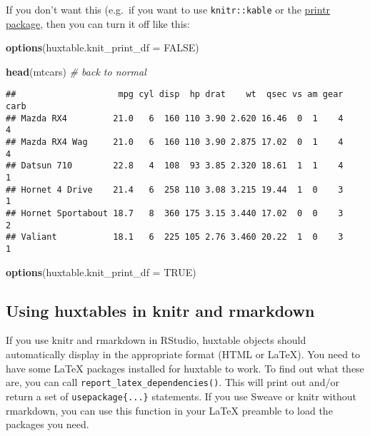 \documentclass[]{article}
\newenvironment{Shaded}{\begin{snugshade}}{\end{snugshade}}
\newcommand{\KeywordTok}[1]{\textcolor[rgb]{0.13,0.29,0.53}{\textbf{#1}}}
\newcommand{\DataTypeTok}[1]{\textcolor[rgb]{0.13,0.29,0.53}{#1}}
\newcommand{\CommentTok}[1]{\textcolor[rgb]{0.56,0.35,0.01}{\textit{#1}}}
\newcommand{\OtherTok}[1]{\textcolor[rgb]{0.56,0.35,0.01}{#1}}
\newcommand{\NormalTok}[1]{#1}
\begin{document}
\FloatBarrier

If you don't want this (e.g.~if you want to use \texttt{knitr::kable} or
the
\href{https://cran.r-project.org/package=printr/vignettes/printr.html}{printr
package}, then you can turn it off like this:

\begin{Shaded}
\begin{Highlighting}[]
\KeywordTok{options}\NormalTok{(}\DataTypeTok{huxtable.knit_print_df =} \OtherTok{FALSE}\NormalTok{)}

\KeywordTok{head}\NormalTok{(mtcars) }\CommentTok{# back to normal}
\end{Highlighting}
\end{Shaded}

\begin{verbatim}
##                    mpg cyl disp  hp drat    wt  qsec vs am gear carb
## Mazda RX4         21.0   6  160 110 3.90 2.620 16.46  0  1    4    4
## Mazda RX4 Wag     21.0   6  160 110 3.90 2.875 17.02  0  1    4    4
## Datsun 710        22.8   4  108  93 3.85 2.320 18.61  1  1    4    1
## Hornet 4 Drive    21.4   6  258 110 3.08 3.215 19.44  1  0    3    1
## Hornet Sportabout 18.7   8  360 175 3.15 3.440 17.02  0  0    3    2
## Valiant           18.1   6  225 105 2.76 3.460 20.22  1  0    3    1
\end{verbatim}

\begin{Shaded}
\begin{Highlighting}[]
\KeywordTok{options}\NormalTok{(}\DataTypeTok{huxtable.knit_print_df =} \OtherTok{TRUE}\NormalTok{)}
\end{Highlighting}
\end{Shaded}

\FloatBarrier

\subsection{Using huxtables in knitr and
rmarkdown}\label{using-huxtables-in-knitr-and-rmarkdown}

If you use knitr and rmarkdown in RStudio, huxtable objects should
automatically display in the appropriate format (HTML or LaTeX). You
need to have some LaTeX packages installed for huxtable to work. To find
out what these are, you can call \texttt{report\_latex\_dependencies()}.
This will print out and/or return a set of \texttt{usepackage\{...\}}
statements. If you use Sweave or knitr without rmarkdown, you can use
this function in your LaTeX preamble to load the packages you need.
\end{document}
